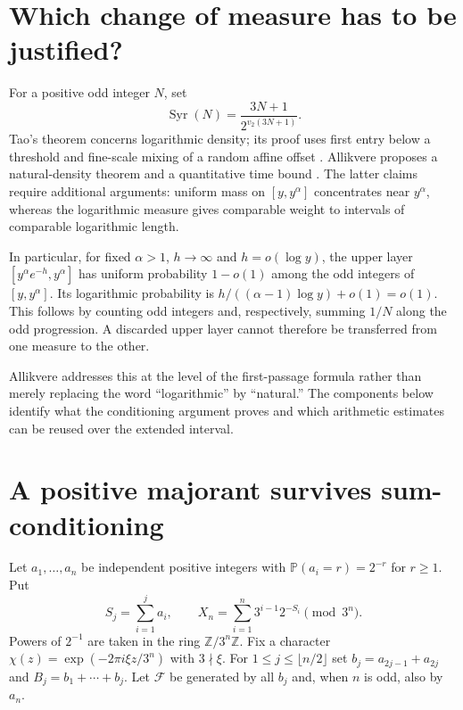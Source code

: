 \documentclass[11pt]{article}
\theoremstyle{remark}\newtheorem{remark}[proposition]{Remark}
\newcommand{\PP}{\mathbb P}
\newcommand{\ZZ}{\mathbb Z}
\newcommand{\Syr}{\operatorname{Syr}}
\begin{document}
\section{Which change of measure has to be justified?}

For a positive odd integer $N$, set
\[
 \Syr(N)=\frac{3N+1}{2^{v_2(3N+1)}}.
\]
Tao's theorem concerns logarithmic density; its proof uses first entry below
a threshold and fine-scale mixing of a random affine offset
\cite{Tao7}. Allikvere proposes a natural-density theorem and a quantitative
time bound \cite{Allikvere}. The latter claims require additional arguments:
uniform mass on $[y,y^\alpha]$ concentrates near $y^\alpha$, whereas the
logarithmic measure gives comparable weight to intervals of comparable
logarithmic length.

In particular, for fixed $\alpha>1$, $h\to\infty$ and
$h=o(\log y)$, the upper layer
$[y^\alpha e^{-h},y^\alpha]$ has uniform probability $1-o(1)$ among the
odd integers of $[y,y^\alpha]$. Its logarithmic probability is
$h/((\alpha-1)\log y)+o(1)=o(1)$. This follows by counting odd integers
and, respectively, summing $1/N$ along the odd progression. A discarded
upper layer cannot therefore be transferred from one measure to the other.

Allikvere addresses this at the level of the first-passage formula rather
than merely replacing the word ``logarithmic'' by ``natural.'' The
components below identify what the conditioning argument proves and which
arithmetic estimates can be reused over the extended interval.

\section{A positive majorant survives sum-conditioning}

Let $a_1,\ldots,a_n$ be independent positive integers with
$\PP(a_i=r)=2^{-r}$ for $r\geq1$. Put
\[
 S_j=\sum_{i=1}^j a_i,\qquad
 X_n=\sum_{i=1}^n3^{i-1}2^{-S_i}\pmod{3^n}.
\]
Powers of $2^{-1}$ are taken in the ring $\ZZ/3^n\ZZ$. Fix a character
$\chi(z)=\exp(-2\pi i\xi z/3^n)$ with $3\nmid\xi$.
For $1\leq j\leq\lfloor n/2\rfloor$ set
$b_j=a_{2j-1}+a_{2j}$ and $B_j=b_1+\cdots+b_j$. Let $\mathcal F$ be
generated by all $b_j$ and, when $n$ is odd, also by $a_n$.
\end{document}
